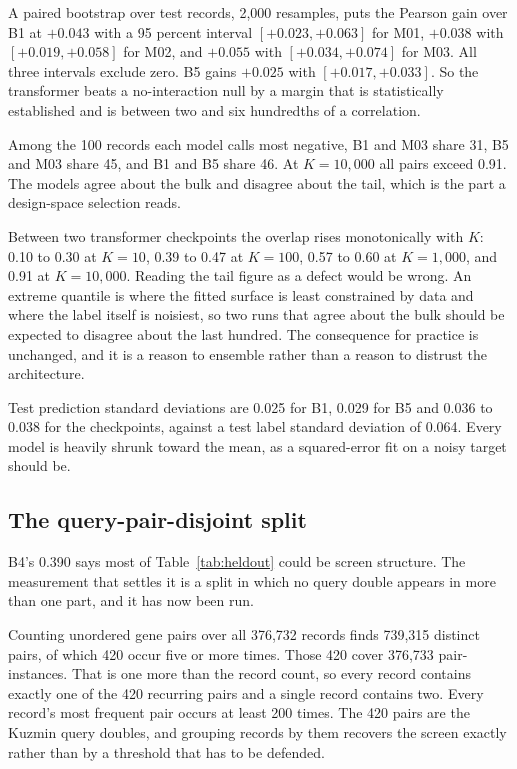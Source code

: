 A paired bootstrap over test records, 2{,}000 resamples, puts the Pearson gain
over B1 at $+0.043$ with a 95 percent interval $[+0.023, +0.063]$ for M01,
$+0.038$ with $[+0.019, +0.058]$ for M02, and $+0.055$ with $[+0.034, +0.074]$
for M03. All three intervals exclude zero. B5 gains $+0.025$ with
$[+0.017, +0.033]$. So the transformer beats a no-interaction null by a margin
that is statistically established and is between two and six hundredths of a
correlation.

Among the 100 records each model calls most negative, B1 and M03 share 31,
B5 and M03 share 45, and B1 and B5 share 46. At $K = 10{,}000$ all pairs exceed
0.91. The models agree about the bulk and disagree about the tail, which is the
part a design-space selection reads.

Between two transformer checkpoints the overlap rises monotonically with $K$:
0.10 to 0.30 at $K = 10$, 0.39 to 0.47 at $K = 100$, 0.57 to 0.60 at
$K = 1{,}000$, and 0.91 at $K = 10{,}000$. Reading the tail figure as a defect
would be wrong. An extreme quantile is where the fitted surface is least
constrained by data and where the label itself is noisiest, so two runs that
agree about the bulk should be expected to disagree about the last hundred. The
consequence for practice is unchanged, and it is a reason to ensemble rather than
a reason to distrust the architecture.

Test prediction standard deviations are 0.025 for B1, 0.029 for B5 and 0.036 to
0.038 for the checkpoints, against a test label standard deviation of 0.064.
Every model is heavily shrunk toward the mean, as a squared-error fit on a noisy
target should be.

\subsection{The query-pair-disjoint split}
\label{sec:disjoint}

B4's 0.390 says most of Table~\ref{tab:heldout} could be screen structure. The
measurement that settles it is a split in which no query double appears in more
than one part, and it has now been run.

Counting unordered gene pairs over all 376{,}732 records finds 739{,}315
distinct pairs, of which 420 occur five or more times. Those 420 cover 376{,}733
pair-instances. That is one more than the record count, so every record contains
exactly one of the 420 recurring pairs and a single record contains two. Every
record's most frequent pair occurs at least 200 times. The 420 pairs are the
Kuzmin query doubles, and grouping records by them recovers the screen exactly
rather than by a threshold that has to be defended.


